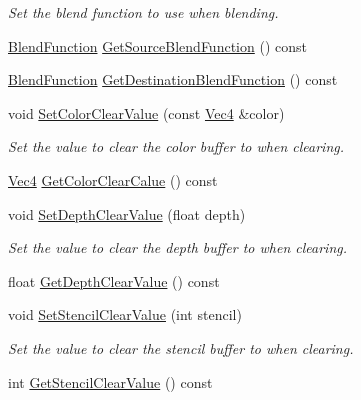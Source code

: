 \begin{DoxyCompactItemize}
\begin{DoxyCompactList}\small\item\em Set the blend function to use when blending. \end{DoxyCompactList}\item 
\hyperlink{namespace_g_f_w_ac19434e926d01e02140f07e74ff36f3c}{Blend\+Function} \hyperlink{class_g_f_w_1_1_context_state_abd9c0c7e6dc4d31cf9b9203718dfd3ee}{Get\+Source\+Blend\+Function} () const
\item 
\hyperlink{namespace_g_f_w_ac19434e926d01e02140f07e74ff36f3c}{Blend\+Function} \hyperlink{class_g_f_w_1_1_context_state_a90b57498e47494b9c3f5d70c61c4ec38}{Get\+Destination\+Blend\+Function} () const
\item 
void \hyperlink{class_g_f_w_1_1_context_state_aa38214d4dd523c36e281c93125691dc5}{Set\+Color\+Clear\+Value} (const \hyperlink{namespace_g_f_w_1_1_math_a22b76a9624ba36b0f4eaa46d2e6b1fae}{Vec4} \&color)
\begin{DoxyCompactList}\small\item\em Set the value to clear the color buffer to when clearing. \end{DoxyCompactList}\item 
\hyperlink{namespace_g_f_w_1_1_math_a22b76a9624ba36b0f4eaa46d2e6b1fae}{Vec4} \hyperlink{class_g_f_w_1_1_context_state_a062d3326dae5fb494b28391d832ece16}{Get\+Color\+Clear\+Calue} () const
\item 
void \hyperlink{class_g_f_w_1_1_context_state_a1c4e031a0199eea45a508f54b4c1e774}{Set\+Depth\+Clear\+Value} (float depth)
\begin{DoxyCompactList}\small\item\em Set the value to clear the depth buffer to when clearing. \end{DoxyCompactList}\item 
float \hyperlink{class_g_f_w_1_1_context_state_a807dad661c3be910ede6f15810210e15}{Get\+Depth\+Clear\+Value} () const
\item 
void \hyperlink{class_g_f_w_1_1_context_state_ace57bac69f05af23f1f65626a83cf22b}{Set\+Stencil\+Clear\+Value} (int stencil)
\begin{DoxyCompactList}\small\item\em Set the value to clear the stencil buffer to when clearing. \end{DoxyCompactList}\item 
int \hyperlink{class_g_f_w_1_1_context_state_aa7ea61ad3f05efb7da33eef7a51ad547}{Get\+Stencil\+Clear\+Value} () const
\end{DoxyCompactItemize}


